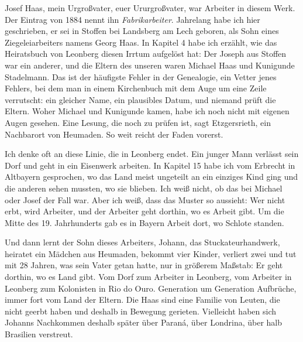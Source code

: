 \documentclass[
  ngerman,
  11pt,
  openany]{book}
\begin{document}
Josef Haas, mein Urgroßvater, euer Ururgroßvater, war Arbeiter in diesem
Werk. Der Eintrag von 1884 nennt ihn \emph{Fabrikarbeiter}. Jahrelang
habe ich hier geschrieben, er sei in Stoffen bei Landsberg am Lech
geboren, als Sohn eines Ziegeleiarbeiters namens Georg Haas. In Kapitel
4 habe ich erzählt, wie das Heiratsbuch von Leonberg diesen Irrtum
aufgelöst hat: Der Joseph aus Stoffen war ein anderer, und die Eltern
des unseren waren Michael Haas und Kunigunde Stadelmann. Das ist der
häufigste Fehler in der Genealogie, ein Vetter jenes Fehlers, bei dem
man in einem Kirchenbuch mit dem Auge um eine Zeile verrutscht: ein
gleicher Name, ein plausibles Datum, und niemand prüft die Eltern. Woher
Michael und Kunigunde kamen, habe ich noch nicht mit eigenen Augen
gesehen. Eine Lesung, die noch zu prüfen ist, sagt Etzgersrieth, ein
Nachbarort von Heumaden. So weit reicht der Faden vorerst.

Ich denke oft an diese Linie, die in Leonberg endet. Ein junger Mann
verlässt sein Dorf und geht in ein Eisenwerk arbeiten. In Kapitel 15
habe ich vom Erbrecht in Altbayern gesprochen, wo das Land meist
ungeteilt an ein einziges Kind ging und die anderen sehen mussten, wo
sie blieben. Ich weiß nicht, ob das bei Michael oder Josef der Fall war.
Aber ich weiß, dass das Muster so aussieht: Wer nicht erbt, wird
Arbeiter, und der Arbeiter geht dorthin, wo es Arbeit gibt. Um die Mitte
des 19. Jahrhunderts gab es in Bayern Arbeit dort, wo Schlote standen.

Und dann lernt der Sohn dieses Arbeiters, Johann, das
Stuckateurhandwerk, heiratet ein Mädchen aus Heumaden, bekommt vier
Kinder, verliert zwei und tut mit 28 Jahren, was sein Vater getan hatte,
nur in größerem Maßstab: Er geht dorthin, wo es Land gibt. Vom Dorf zum
Arbeiter in Leonberg, vom Arbeiter in Leonberg zum Kolonisten in Rio do
Ouro. Generation um Generation Aufbrüche, immer fort vom Land der
Eltern. Die Haas sind eine Familie von Leuten, die nicht geerbt haben
und deshalb in Bewegung gerieten. Vielleicht haben sich Johanns
Nachkommen deshalb später über Paraná, über Londrina, über halb
Brasilien verstreut.
\end{document}
